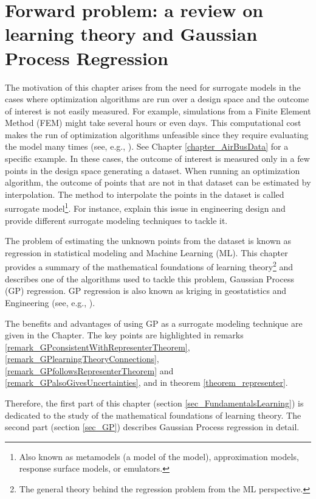 \chapter[Forward problem]{Forward problem: a review on learning theory and Gaussian Process Regression} \label{chapter_forwardProblem} 

The motivation of this chapter arises from the need for surrogate models in the cases where optimization algorithms are run over a design space and the outcome of interest is not easily measured.
For example, simulations from a Finite Element Method (FEM) might take several hours or even days. This computational cost makes the run of optimization algorithms unfeasible since they require evaluating the model many times (see, e.g., \textcite{wang2005}).
See Chapter \ref{chapter_AirBusData} for a specific example.
In these cases, the outcome of interest is measured only in a few points in the design space generating a dataset. When running an optimization algorithm, the outcome of points that are not in that dataset can be estimated by interpolation. 
The method to interpolate the points in the dataset is called surrogate model\footnote{
Also known as metamodels (a model of the model), approximation models, response surface models, or emulators.
}. 
For instance, \textcite{forrester2008} explain this issue in engineering design and provide different surrogate modeling techniques to tackle it.

The problem of estimating the unknown points from the dataset is known as regression in statistical modeling and Machine Learning (ML).
This chapter provides a summary of the mathematical foundations of learning theory\footnote{
The general theory behind the regression problem from the ML perspective.
}
and describes one of the algorithms used to tackle this problem, Gaussian Process (GP) regression.
GP regression is also known as kriging in geostatistics and Engineering (see, e.g., \textcite{simpson2001}). 

The benefits and advantages of using GP as a surrogate modeling technique are given in the Chapter. The key points are highlighted in remarks \ref{remark_GPconsistentWithRepresenterTheorem}, \ref{remark_GPlearningTheoryConnections}, \ref{remark_GPfollowsRepresenterTheorem} and \ref{remark_GPalsoGivesUncertainties}, and in theorem \ref{theorem_representer}.

Therefore, the first part of this chapter (section \ref{sec_FundamentalsLearning}) is dedicated to the study of the mathematical foundations of learning theory.
The second part (section \ref{sec_GP}) describes Gaussian Process regression in detail.

